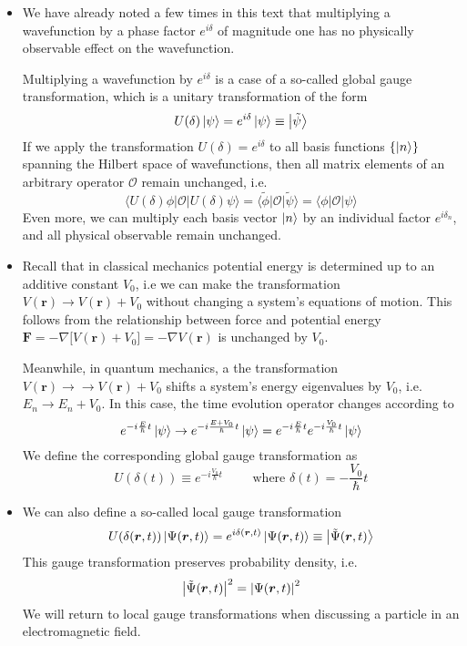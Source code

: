 \documentclass[11pt, a4paper]{article}
\renewcommand{\grad}{\nabla}
\renewcommand{\vec}[1]{\bm{#1}} %
\renewcommand{\t}[1]{\tilde{#1}}
\renewcommand{\r}{\vec{r}}  %
\renewcommand{\O}{\mathcal{O}}  %
\newcommand{\p}{\psi}  %
\renewcommand{\P}{\Psi}  %
\newcommand{\bket}[1]{\big | {#1} \big \rangle }
\newcommand{\bmel}[3]{\big \langle {#1} \big | {#2} \big | {#3} \big \rangle}  %
\renewcommand{\k}[1]{\ket{#1}}
\begin{document}
\begin{itemize}
	\item We have already noted a few times in this text that multiplying a wavefunction by a phase factor $ e^{i\delta} $ of magnitude one has no physically observable effect on the wavefunction. 
	
	Multiplying a wavefunction by $ e^{i\delta} $ is a case of a so-called global gauge transformation, which is a unitary transformation of the form
	\begin{equation*}
		U(\delta)\ket{\psi} = e^{i\delta}\ket{\p} \equiv \bket{\tilde{\p}}
	\end{equation*}
	If we apply the transformation $ U(\delta) = e^{i\delta} $ to all basis functions $ \{\ket{n}\} $ spanning the Hilbert space of wavefunctions, then all matrix elements of an arbitrary operator $ \O $ remain unchanged, i.e. 
	\begin{equation*}
		\bmel{U(\delta) \phi}{\O}{U(\delta)\p} = \bmel{\t{\phi}}{\O}{\t{\p}} = \bmel{\phi}{\O}{\p} 
	\end{equation*}
	Even more, we can multiply each basis vector $ \ket{n} $ by an individual factor $ e^{i \delta_{n}} $, and all physical observable remain unchanged.
	
	\item Recall that in classical mechanics potential energy is determined up to an additive constant $ V_{0} $, i.e we can make the transformation $ V(\r) \to V(\r) + V_{0} $ without changing a system's equations of motion. This follows from the relationship between force and potential energy $ \vec{F} = - \grad\big[V(\r) + V_{0}\big] = - \grad V(\r) $ is unchanged by $ V_{0} $.
	
	Meanwhile, in quantum mechanics, a the transformation $ V(\r) \to \to V(\r) + V_{0} $ shifts a system's energy eigenvalues by $ V_{0} $, i.e. $ E_{n} \to E_{n} + V_{0} $. In this case, the time evolution operator changes according to
	\begin{equation*}
		e^{-i\frac{E}{\hbar}t}\k{\p} \to e^{-i\frac{E+V_{0}}{\hbar}t}\k{\p} = e^{-i\frac{E}{\hbar}t} e^{-i\frac{V_{0}}{\hbar}t}  \k{\p} 
	\end{equation*}
	We define the corresponding global gauge transformation as
	\begin{equation*}
		U(\delta(t)) \equiv e^{-i\frac{V_{0}}{\hbar}t} \qquad \text{ where } \delta(t) = -\frac{V_{0}}{\hbar}t
	\end{equation*}
	
	\item We can also define a so-called local gauge transformation
	\begin{equation*}
		U(\delta(\r, t)) \ket{\P(\r, t)} = e^{i\delta(\r, t)}\ket{\P(\r, t)} \equiv \bket{\t{\P}(\r, t)}
	\end{equation*}
	This gauge transformation preserves probability density, i.e.
	\begin{equation*}
		\big|\t{\P}(\r, t) \big|^{2} = \abs{\P(\r, t)}^{2}
	\end{equation*}
	We will return to local gauge transformations when discussing a particle in an electromagnetic field. 
\end{itemize}
\end{document}
